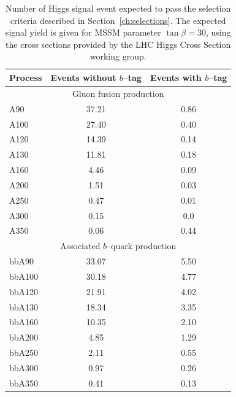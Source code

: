 \begin{table}[t]
\begin{center}
\begin{tabular}{|l|c|c|}
\hline
Process & Events without $b$--tag & Events with $b$--tag \\
\hline
\hline
\multicolumn{3}{|c|}{Gluon fusion production} \\
\hline
A90 & 37.21 & 0.86 \\
A100 & 27.40 & 0.40 \\
A120 & 14.39 & 0.14 \\
A130 & 11.81 & 0.18 \\
A160 & 4.46 & 0.09 \\
A200 & 1.51 & 0.03 \\
A250 & 0.47 & 0.01 \\
A300 & 0.15 & 0.0 \\
A350 & 0.06 & 0.44 \\
\hline
\multicolumn{3}{|c|}{Associated $b$--quark production} \\
\hline
bbA90 & 33.07 &  5.50 \\
bbA100 & 30.18 &  4.77 \\
bbA120 & 21.91 & 4.02 \\
bbA130 & 18.34 & 3.35 \\ 
bbA160 & 10.35 &  2.10 \\
bbA200 & 4.85  &  1.29 \\
bbA250 & 2.11 &  0.55 \\
bbA300 & 0.97 &  0.26 \\
bbA350 & 0.41 & 0.13 \\
\hline
\end{tabular}
\caption[Expected signal yields at \mbox{$\tan \beta = 30$}]{Number of Higgs
signal event expected to pass the selection criteria described in
Section~\ref{ch:selections}.  The expected signal yield is given for MSSM
parameter \mbox{$\tan \beta = 30$}, using the cross sections provided by the LHC
Higgs Cross Section working group.} \label{tab:SignalExpResultsLooseAHtoMuTau}
\end{center}
\end{table}

